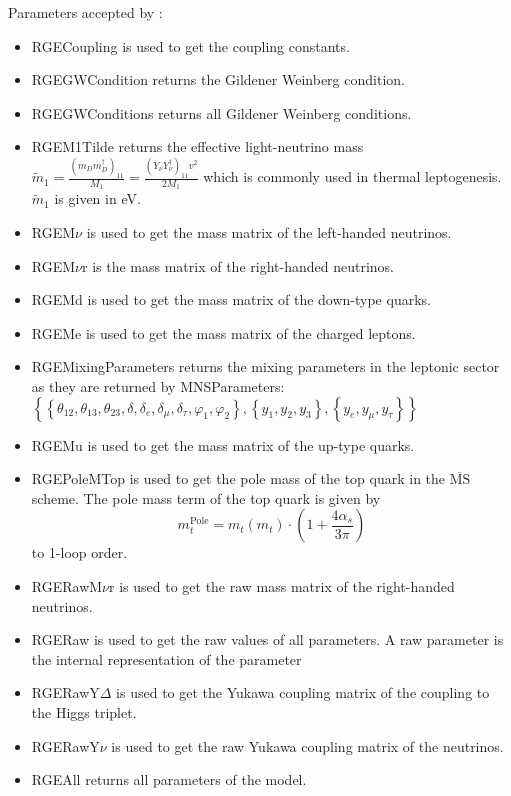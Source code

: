\documentclass[10pt,a4paper,twoside]{scrartcl}
\begin{document}
Parameters accepted by :
\begin{itemize}
\item 
RGECoupling is used to get the coupling constants.
\item 
RGEGWCondition returns the Gildener Weinberg condition.
\item 
RGEGWConditions returns all Gildener Weinberg conditions.
\item 
RGEM1Tilde returns the effective light-neutrino mass $\widetilde{m}_1 =
\frac{\left(m_D m_D^\dagger\right)_{11}}{M_1}=\frac{(Y_\nu Y_\nu^\dagger)_{11} 
v^2}{2 M_1}$ which is commonly used in thermal leptogenesis. $\widetilde{m}_1$ is
given in eV.
\item 
RGEM$\nu$ is used to get the mass matrix of the left-handed neutrinos.
\item 
RGEM$\nu$r is the mass matrix of the right-handed neutrinos.
\item 
RGEMd is used to get the mass matrix of the down-type quarks.
\item 
RGEMe is used to get the mass matrix of the charged leptons.
\item 
RGEMixingParameters returns the mixing parameters in the leptonic sector as they
are returned by MNSParameters: $\left\{\left\{\theta_{12},\theta_{13},\theta_{23},\delta,\delta_e,\delta_\mu,\delta_\tau,\varphi_1,\varphi_2\right\},\left\{y_1,y_2,y_3\right\},\left\{y_e,y_\mu,y_\tau\right\}\right\}$
\item 
RGEMu is used to get the mass matrix of the up-type quarks.
\item 
RGEPoleMTop is used to get the pole mass of the top quark in the
$\overline{\text{MS}}$ scheme. The pole mass term of the top quark is given by
\begin{equation}
m_t^\text{Pole} = m_t(m_t) \cdot (1 + \frac{4\alpha_s}{3\pi})
\end{equation}
to 1-loop order.
\item 
RGERawM$\nu$r is used to get the raw mass matrix of the right-handed neutrinos.
\item 
RGERaw is used to get the raw values of all parameters. A raw parameter is
the internal representation of the parameter
\item 
RGERawY$\Delta$ is used to get the Yukawa coupling matrix of the coupling to the Higgs triplet.
\item 
RGERawY$\nu$ is used to get the raw Yukawa coupling matrix of the
neutrinos.
\item 
RGEAll returns all parameters of the model.

\end{itemize}
\end{document}
